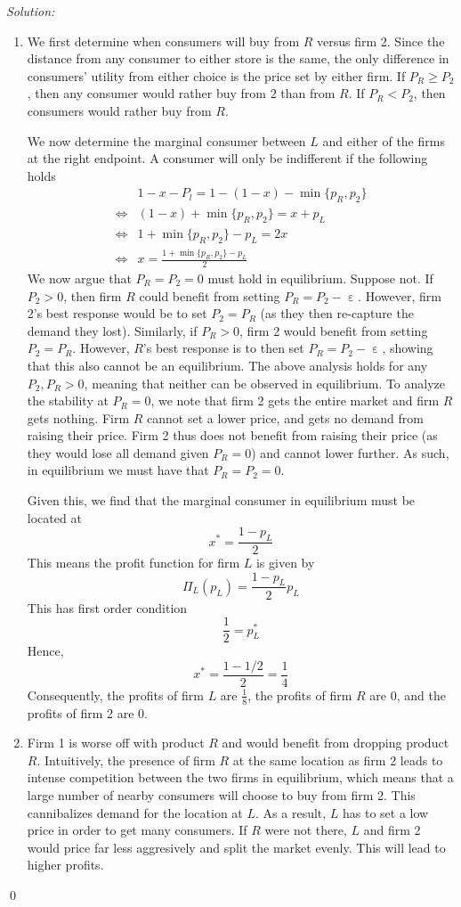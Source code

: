 \documentclass[12pt]{article}
\DeclareMathOperator{\eps}{\varepsilon}
\newenvironment{sol}
    {\emph{Solution:}
    }
    {
    \qed
    }
\begin{document}
\begin{sol}
    \begin{enumerate}[label=\alph*) ]
        \item We first determine when consumers will buy from $R$ versus firm 2. Since the distance from any consumer to either store is the same, the only difference in consumers' utility from either choice is the price set by either firm. If $P_R \geq P_2$, then any consumer would rather buy from $2$ than from $R$. If $P_R < P_2$, then consumers would rather buy from $R$.
        
        We now determine the marginal consumer between $L$ and either of the firms at the right endpoint. A consumer will only be indifferent if the following holds
        \begin{align*}
            &1 - x - P_l = 1 - (1-x) - \min\{p_R, p_2\}\\
            \iff& (1-x ) + \min\{p_R, p_2\} = x + p_L\\
            \iff & 1 + \min\{p_R, p_2\} - p_L = 2x\\
            \iff& x = \frac{1 + \min\{p_R, p_2\} - p_L}{2}
        \end{align*}
        We now argue that $P_R = P_2 = 0$ must hold in equilibrium. Suppose not. If $P_2 > 0$, then firm $R$ could benefit from setting $P_R = P_2 - \eps$. However, firm 2's best response would be to set $P_2 = P_R$ (as they then re-capture the demand they lost). Similarly, if $P_R > 0$, firm 2 would benefit from setting $P_2 = P_R$. However, $R$'s best response is to then set $P_R = P_2 - \eps$, showing that this also cannot be an equilibrium. The above analysis holds for any $P_2, P_R > 0$, meaning that neither can be observed in equilibrium. To analyze the stability at $P_R = 0$, we note that firm 2 gets the entire market and firm $R$ gets nothing. Firm $R$ cannot set a lower price, and gets no demand from raising their price. Firm 2 thus does not benefit from raising their price (as they would lose all demand given $P_R = 0$) and cannot lower further. As such, in equilibrium we must have that $P_R = P_2 = 0$.

        Given this, we find that the marginal consumer in equilibrium must be located at 
        \[x^* = \frac{1 - p_L}{2}\]
        This means the profit function for firm $L$ is given by
        \[\Pi_L(p_L) = \frac{1-p_L}{2} p_L\]
        This has first order condition 
        \[\frac{1}{2} = p_L^*\]
        Hence, 
        \[x^* = \frac{1 - 1/2}{2} = \frac{1}{4}\]
        Consequently, the profits of firm $L$ are $\frac{1}{8}$, the profits of firm $R$ are 0, and the profits of firm 2 are 0.
        \item Firm 1 is worse off with product $R$ and would benefit from dropping product $R$. Intuitively, the presence of firm $R$ at the same location as firm 2 leads to intense competition between the two firms in equilibrium, which means that a large number of nearby consumers will choose to buy from firm 2. This cannibalizes demand for the location at $L$. As a result, $L$ has to set a low price in order to get many consumers. If $R$ were not there, $L$ and firm 2 would price far less aggresively and split the market evenly. This will lead to higher profits. 
        

\end{enumerate}
\end{sol}
\end{document}
